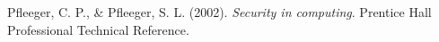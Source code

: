 
\begin{thebibliography}{9}

  Pfleeger, C. P., \& Pfleeger, S. L.
  (2002).
  \textit{Security in computing}.
  Prentice Hall Professional Technical Reference.

\end{thebibliography}
